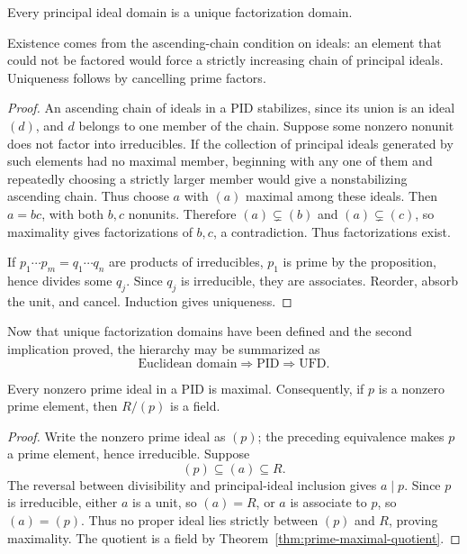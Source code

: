\begin{theorem}\label{thm:pid-ufd}
Every principal ideal domain is a unique factorization domain.
\end{theorem}
\begin{proofidea}
Existence comes from the ascending-chain condition on ideals: an element that
could not be factored would force a strictly increasing chain of principal
ideals.  Uniqueness follows by cancelling prime factors.
\end{proofidea}
\begin{proof}
An ascending chain of ideals in a PID stabilizes, since its union is an ideal
\((d)\), and \(d\) belongs to one member of the chain.  Suppose some nonzero
nonunit does not factor into irreducibles.  If the collection of principal
ideals generated by such elements had no maximal member, beginning with any
one of them and repeatedly choosing a strictly larger member would give a
nonstabilizing ascending chain.  Thus choose \(a\) with \((a)\) maximal
among these ideals.  Then \(a=bc\), with both
\(b,c\) nonunits.  Therefore \((a)\subsetneq(b)\) and
\((a)\subsetneq(c)\), so maximality gives factorizations of \(b,c\), a
contradiction.  Thus factorizations exist.

If \(p_1\cdots p_m=q_1\cdots q_n\) are products of irreducibles, \(p_1\) is
prime by the proposition, hence divides some \(q_j\).  Since \(q_j\) is
irreducible, they are associates.  Reorder, absorb the unit, and cancel.
Induction gives uniqueness.
\end{proof}

Now that unique factorization domains have been defined and the second
implication proved, the hierarchy may be summarized as
\[
\text{Euclidean domain}\Longrightarrow\text{PID}
\Longrightarrow\text{UFD}.
\]

\begin{proposition}
\label{prop:pid-nonzero-prime-maximal}
Every nonzero prime ideal in a PID is maximal. Consequently, if \(p\) is a
nonzero prime element, then \(R/(p)\) is a field.
\end{proposition}
\begin{proof}
Write the nonzero prime ideal as \((p)\); the preceding equivalence makes
\(p\) a prime element, hence irreducible. Suppose
\[
(p)\subseteq(a)\subseteq R.
\]
The reversal between divisibility and principal-ideal inclusion gives
\(a\mid p\). Since \(p\) is irreducible, either \(a\) is a unit, so
\((a)=R\), or \(a\) is associate to \(p\), so \((a)=(p)\). Thus no proper
ideal lies strictly between \((p)\) and \(R\), proving maximality. The
quotient is a field by Theorem~\ref{thm:prime-maximal-quotient}.
\end{proof}

